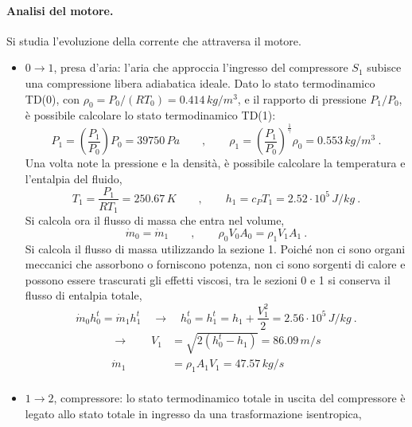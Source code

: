 \paragraph{Analisi del motore.}
Si studia l'evoluzione della corrente che attraversa il motore.
\begin{itemize}
 \item $0 \rightarrow 1$, presa d'aria: l'aria che approccia l'ingresso del compressore $S_1$ subisce una compressione libera adiabatica ideale. Dato lo stato termodinamico TD(0), con $\rho_0 = P_0/ (R T_0) = 0.414 \, kg/m^3$, e il rapporto di pressione $P_1 / P_0$, è possibile calcolare lo stato termodinamico TD(1):
 \begin{equation}
   P_1 = \left( \dfrac{P_1}{P_0} \right) P_0 = 39750 \, Pa \qquad , \qquad
\rho_1 = \left( \dfrac{P_1}{P_0} \right)^{\frac{1}{\gamma}} \rho_0 = 0.553 \, kg/m^3 \ .
 \end{equation}
Una volta note la pressione e la densità, è possibile calcolare la temperatura e l'entalpia del fluido,
\begin{equation}
 T_1 = \dfrac{P_1}{R T_1} = 250.67 \, K \qquad , \qquad h_1 = c_P T_1 = 2.52 \cdot 10^5 \, J/kg \ .
\end{equation}
Si calcola ora il flusso di massa che entra nel volume,
\begin{equation}
  \dot{m}_0 = \dot{m}_1 \qquad , \qquad \rho_0 V_0 A_0 = \rho_1 V_1 A_1 \ .
\end{equation}
Si calcola il flusso di massa utilizzando la sezione 1. Poiché non ci sono organi meccanici che assorbono o forniscono potenza, non ci sono sorgenti di calore e possono essere trascurati gli effetti viscosi, tra le sezioni 0 e 1 si conserva il flusso di entalpia totale,
\begin{equation}
  \dot{m}_0 h_0^t = \dot{m}_1 h_1^t 
  \quad \rightarrow \quad h_0^t = h_1^t = h_1 + \dfrac{V_1^2}{2} = 2.56 \cdot 10^5 \, J/kg \ .
\end{equation}
\begin{equation}
\begin{aligned}
 \rightarrow \qquad V_1 & = \sqrt{2(h_0^t - h_1)} = 86.09 \, m/s \\
 \dot{m}_1 & = \rho_1 A_1 V_1 = 47.57 \, kg/s \\
\end{aligned}
\end{equation}
 \item $1 \rightarrow 2$, compressore: lo stato termodinamico totale in uscita del compressore è legato allo stato totale in ingresso da una trasformazione isentropica,

\end{itemize}
